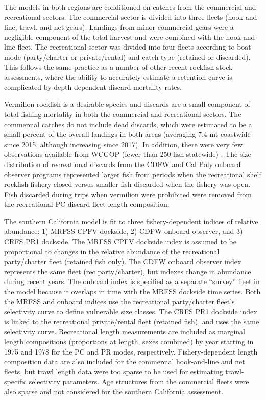 \documentclass[
  english,
  a4paper,
]{article}
\begin{document}
The models in both regions are conditioned on catches from the commercial and recreational sectors. The commercial sector is divided into three fleets (hook-and-line, trawl, and net gears). Landings from minor commercial gears were a negligible component of the total harvest and were combined with the hook-and-line fleet. The recreational sector was divided into four fleets according to boat mode (party/charter or private/rental) and catch type (retained or discarded). This follows the same practice as a number of other recent rockfish stock assessments, where the ability to accurately estimate a retention curve is complicated by depth-dependent discard mortality rates.

Vermilion rockfish is a desirable species and discards are a small component of total fishing mortality in both the commercial and recreational sectors. The commercial catches do not include dead discards, which were estimated to be a small percent of the overall landings in both areas (averaging 7.4 mt coastwide since 2015, although increasing since 2017). In addition, there were very few observations available from WCGOP (fewer than 250 fish statewide) . The size distribution of recreational discards from the CDFW and Cal Poly onboard observer programs represented larger fish from periods when the recreational shelf rockfish fishery closed versus smaller fish discarded when the fishery was open. Fish discarded during trips when vermilion were prohibited were removed from the recreational PC discard fleet length composition.

The southern California model is fit to three fishery-dependent indices of relative abundance: 1) MRFSS CPFV dockside, 2) CDFW onboard observer, and 3) CRFS PR1 dockside. The MRFSS CPFV dockside index is assumed to be proportional to changes in the relative abundance of the recreational party/charter fleet (retained fish only). The CDFW onboard observer index represents the same fleet (rec party/charter), but indexes change in abundance during recent years. The onboard index is specified as a separate ``survey'' fleet in the model because it overlaps in time with the MRFSS dockside time series. Both the MRFSS and onboard indices use the recreational party/charter fleet's selectivity curve to define vulnerable size classes. The CRFS PR1 dockside index is linked to the recreational private/rental fleet (retained fish), and uses the same selectivity curve. Recreational length measurements are included as marginal length compositions (proportions at length, sexes combined) by year starting in 1975 and 1978 for the PC and PR modes, respectively. Fishery-dependent length composition data are also included for the commercial hook-and-line and net fleets, but trawl length data were too sparse to be used for estimating trawl-specific selectivity parameters. Age structures from the commercial fleets were also sparse and not considered for the southern California assessment.
\end{document}
